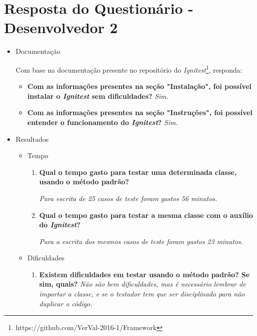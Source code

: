\chapter{Resposta do Questionário - Desenvolvedor 2}
    
    \begin{itemize}
        \item Documentação
        
            Com base na documentação presente no repositório do \textit{Ignitest}\footnote{https://github.com/VerVal-2016-1/Framework}, responda:
            \begin{itemize}
                \item \textbf{Com as informações presentes na seção "Instalação", foi possível instalar o \textit{Ignitest} sem dificuldades?}
                    \subitem \textit{Sim.}

                \item \textbf{Com as informações presentes na seção "Instruções", foi possível entender o funcionamento do \textit{Ignitest}?}
                    \subitem \textit{Sim.}
            \end{itemize}

        \item Resultados
            \begin{itemize}
                \item Tempo
                    \begin{enumerate}
                        \item \textbf{Qual o tempo gasto para testar uma determinada classe, usando o método padrão?}

                            \subitem \textit{Para escrita de 25 casos de teste foram gastos 56 minutos.}              
              
                        \item \textbf{Qual o tempo gasto para testar a mesma classe com o auxílio do \textit{Ignitest}?}
              
                            \subitem \textit{Para a escrita dos mesmos casos de teste foram gastos 23 minutos.}
                        
                    \end{enumerate}
                \item Dificuldades
                    \begin{enumerate}
                        \item \textbf{Existem dificuldades em testar usando o método padrão? Se sim, quais?}
                            \subitem \textit{Não são bem dificuldades, mas é necessário lembrar de importar a classe, e se o testador tem que ser disciplinado para não duplicar o código.}


\end{enumerate}
\end{itemize}
\end{itemize}
